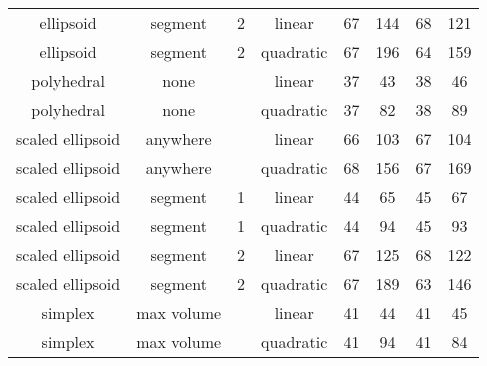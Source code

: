 \begin{center}
\begin{longtable}{ c c c c c c c c }
                ellipsoid &    segment &     2 &     linear &  67  &   144  &   68 &  121 \\
                ellipsoid &    segment &     2 &  quadratic &  67  &   196  &   64 &  159 \\
               polyhedral &       none &       &     linear &  37  &    43  &   38 &   46 \\
               polyhedral &       none &       &  quadratic &  37  &    82  &   38 &   89 \\
         scaled ellipsoid &   anywhere &       &     linear &  66  &   103  &   67 &  104 \\
         scaled ellipsoid &   anywhere &       &  quadratic &  68  &   156  &   67 &  169 \\
         scaled ellipsoid &    segment &     1 &     linear &  44  &    65  &   45 &   67 \\
         scaled ellipsoid &    segment &     1 &  quadratic &  44  &    94  &   45 &   93 \\
         scaled ellipsoid &    segment &     2 &     linear &  67  &   125  &   68 &  122 \\
         scaled ellipsoid &    segment &     2 &  quadratic &  67  &   189  &   63 &  146 \\
                  simplex & max volume &       &     linear &  41  &    44  &   41 &   45 \\
                  simplex & max volume &       &  quadratic &  41  &    94  &   41 &   84 \\


\end{longtable}
\end{center}
